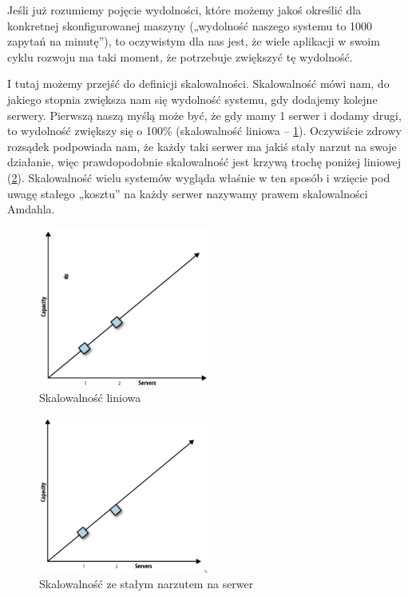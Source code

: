 \documentclass[a4paper,12pt]{article}
\begin{document}
Jeśli już rozumiemy pojęcie wydolności, które możemy jakoś określić dla konkretnej skonfigurowanej maszyny („wydolność naszego systemu to 1000 zapytań na minutę”), to oczywistym dla nas jest, że wiele aplikacji w swoim cyklu rozwoju ma taki moment, że potrzebuje zwiększyć tę wydolność.

I tutaj możemy przejść do definicji skalowalności. Skalowalność mówi nam, do jakiego stopnia zwiększa nam się wydolność systemu, gdy dodajemy kolejne serwery. Pierwszą naszą myślą może być, że gdy mamy 1 serwer i dodamy drugi, to wydolność zwiększy się o 100\% (skalowalność liniowa – \ref{fig:scaling-linear}). Oczywiście zdrowy rozsądek podpowiada nam, że każdy taki serwer ma jakiś stały narzut na swoje działanie, więc prawdopodobnie skalowalność jest krzywą trochę poniżej liniowej (\ref{fig:scaling-almost-linear}). Skalowalność wielu systemów wygląda właśnie w ten sposób i wzięcie pod uwagę stałego „kosztu” na każdy serwer nazywamy prawem skalowalności Amdahla.

\begin{figure}[ht]
\centering
\includegraphics[width=0.5\textwidth]{scaling-linear.png}
\caption{Skalowalność liniowa}
\label{fig:scaling-linear}
\end{figure}

\begin{figure}[ht]
\centering
\includegraphics[width=0.5\textwidth]{scaling-almost-linear.png}
\caption{Skalowalność ze stałym narzutem na serwer}
\label{fig:scaling-almost-linear}
\end{figure}
\end{document}
